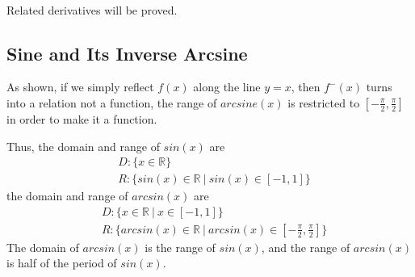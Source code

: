 \documentclass[12pt, titlepage]{article}
\begin{document}
    \\
    Related derivatives will be proved.

    \newpage
    \subsection{Sine and Its Inverse Arcsine}
    \label{sec:arcsine}
        \begin{center}
        \end{center}
        As shown, if we simply reflect $f(x)$ along the line $y=x$, then $f^-(x)$ turns into a relation not a function, the range of $arcsine(x)$ is restricted to $[-\frac{\pi}{2}, \frac{\pi}{2}]$ in order to make it a function.

        Thus, the domain and range of $sin(x)$ are
        \begin{align*}
                &D: \{x\in\mathbb{R}\}\\
                &R: \{sin(x)\in\mathbb{R}\:|\:sin(x)\in [-1,1]\}
        \end{align*}
        the domain and range of $arcsin(x)$ are
        \begin{align*}
                &D: \{x\in\mathbb{R}\:|\:x\in [-1,1]\}\\
                &R: \{arcsin(x)\in\mathbb{R}\:|\:arcsin(x)\in [-\frac{\pi}{2}, \frac{\pi}{2}]\}
        \end{align*}
        The domain of $arcsin(x)$ is the range of $sin(x)$, and the range of $arcsin(x)$ is half of the period of $sin(x)$.
\end{document}
